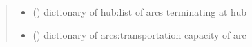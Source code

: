 \documentclass[letterpaper,10pt,english]{sphinxmanual}
\begin{document}
\begin{fulllineitems}
\begin{quote}
\begin{description}
\begin{itemize}
\item {} 
\sphinxAtStartPar
{} () \textendash{} dictionary of hub:list of arcs terminating at hub

\item {} 
\sphinxAtStartPar
{} () \textendash{} dictionary of arcs:transportation capacity of arc

\end{itemize}


\end{description}\end{quote}

\end{fulllineitems}

\end{document}

